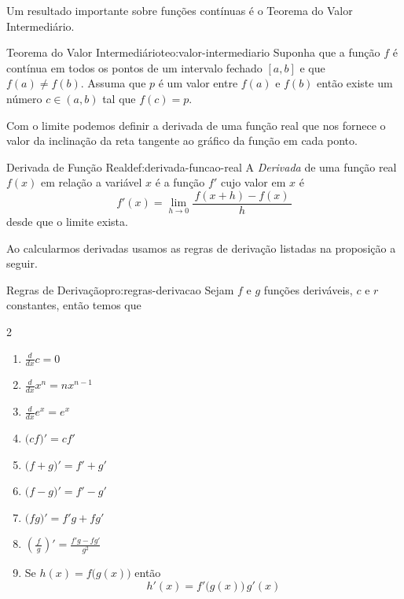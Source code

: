 Um resultado importante sobre funções contínuas é o Teorema do Valor Intermediário.

\begin{teorema}{Teorema do Valor Intermediário}{teo:valor-intermediario}
  Suponha
  que a função $f$ é contínua em todos os pontos de um intervalo fechado
  $[a, b]$ e que \(f(a)\neq f(b)\). Assuma que $p$ é um valor entre $f(a)$ e $f(b)$
  então existe um número $c\in(a, b)$ tal que $f(c)=p$.
\end{teorema}

Com o limite podemos definir a derivada de uma função real que nos fornece o
valor da inclinação da reta tangente ao gráfico da função em cada ponto.

\begin{definicao}{Derivada de Função Real}{def:derivada-funcao-real}
  A \emph{Derivada} de uma função real $f(x)$ em relação
  a variável $x$ é a função $f'$ cujo valor em $x$ é
  \[
    f'(x) = \lim_{h\to 0} \frac{\,f(x+h)-f(x)\,}{h}
  \]
  desde que o limite exista.
\end{definicao}

Ao calcularmos derivadas usamos as regras de derivação listadas na proposição
a seguir.

\begin{proposicao}{Regras de Derivação}{pro:regras-derivacao}
  Sejam $f$ e $g$ funções deriváveis, $c$ e $r$ constantes, então temos que
  \begin{multicols}{2}
    \begin{enumerate}
      \item \( \frac{d}{dx} c = 0 \)
      \item \( \frac{d}{dx} x^n = nx^{n-1} \)
      \item \( \frac{d}{dx} e^x = e^x \)
      \item \( \big(cf\big)' = cf' \)
      \item \( \big(f+g\big)' = f' + g' \)
      \item \( \big(f-g\big)' = f' - g' \)
      \item \( \big(fg\big)' = f'g + fg' \)
      \item \( \left(\frac{f}{\,g\,}\right)' = \frac{f'g - fg'}{g^2} \)
      \item Se \(h(x) = f\big(g(x)\big) \) então  \[ h'(x) = f'\big(g(x)\big)\,g'(x) \]
    \end{enumerate}
  \end{multicols}
\end{proposicao}

